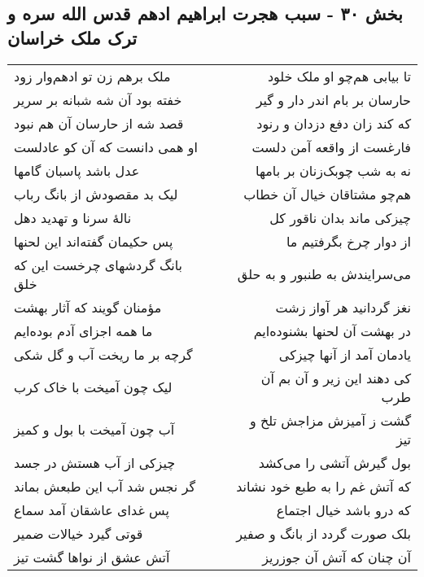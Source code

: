 \begin{center}
\section*{بخش ۳۰ - سبب هجرت ابراهیم ادهم قدس الله سره و ترک ملک خراسان}
\label{sec:sh030}
\begin{longtable}{l p{0.5cm} r}
ملک برهم زن تو ادهم‌وار زود
&&
تا بیابی هم‌چو او ملک خلود
\\
خفته بود آن شه شبانه بر سریر
&&
حارسان بر بام اندر دار و گیر
\\
قصد شه از حارسان آن هم نبود
&&
که کند زان دفع دزدان و رنود
\\
او همی دانست که آن کو عادلست
&&
فارغست از واقعه آمن دلست
\\
عدل باشد پاسبان گامها
&&
نه به شب چوبک‌زنان بر بامها
\\
لیک بد مقصودش از بانگ رباب
&&
هم‌چو مشتاقان خیال آن خطاب
\\
نالهٔ سرنا و تهدید دهل
&&
چیزکی ماند بدان ناقور کل
\\
پس حکیمان گفته‌اند این لحنها
&&
از دوار چرخ بگرفتیم ما
\\
بانگ گردشهای چرخست این که خلق
&&
می‌سرایندش به طنبور و به حلق
\\
مؤمنان گویند که آثار بهشت
&&
نغز گردانید هر آواز زشت
\\
ما همه اجزای آدم بوده‌ایم
&&
در بهشت آن لحنها بشنوده‌ایم
\\
گرچه بر ما ریخت آب و گل شکی
&&
یادمان آمد از آنها چیزکی
\\
لیک چون آمیخت با خاک کرب
&&
کی دهند این زیر و آن بم آن طرب
\\
آب چون آمیخت با بول و کمیز
&&
گشت ز آمیزش مزاجش تلخ و تیز
\\
چیزکی از آب هستش در جسد
&&
بول گیرش آتشی را می‌کشد
\\
گر نجس شد آب این طبعش بماند
&&
که آتش غم را به طبع خود نشاند
\\
پس غدای عاشقان آمد سماع
&&
که درو باشد خیال اجتماع
\\
قوتی گیرد خیالات ضمیر
&&
بلک صورت گردد از بانگ و صفیر
\\
آتش عشق از نواها گشت تیز
&&
آن چنان که آتش آن جوزریز
\\
\end{longtable}
\end{center}
